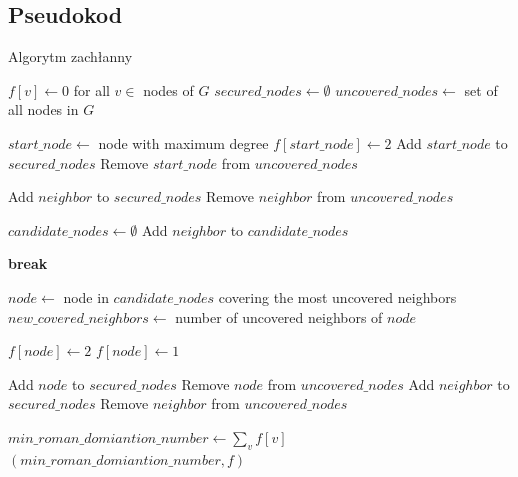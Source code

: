     \subsection{Pseudokod}

    \begin{algorithm}
    \caption*{Algorytm zachłanny}
    \begin{algorithmic}[1]
        \State $f[v] \gets 0$ for all $v \in$ nodes of $G$
        \State $secured\_nodes \gets \emptyset$
        \State $uncovered\_nodes \gets$ set of all nodes in $G$

        \State $start\_node \gets$ node with maximum degree
        \State $f[start\_node] \gets 2$
        \State Add $start\_node$ to $secured\_nodes$
        \State Remove $start\_node$ from $uncovered\_nodes$
        
            \State Add $neighbor$ to $secured\_nodes$
            \State Remove $neighbor$ from $uncovered\_nodes$
        \EndFor

            \State $candidate\_nodes \gets \emptyset$
                        \State Add $neighbor$ to $candidate\_nodes$
                    \EndIf
                \EndFor
            \EndFor

                \State \textbf{break}
            \EndIf

            \State $node \gets$ node in $candidate\_nodes$ covering the most uncovered neighbors
            \State $new\_covered\_neighbors \gets$ number of uncovered neighbors of $node$

                \State $f[node] \gets 2$
            \Else
                \State $f[node] \gets 1$
            \EndIf

            \State Add $node$ to $secured\_nodes$
            \State Remove $node$ from $uncovered\_nodes$
                \State Add $neighbor$ to $secured\_nodes$
                \State Remove $neighbor$ from $uncovered\_nodes$
            \EndFor
        \EndWhile

        \State $min\_roman\_domiantion\_number \gets \sum_{v} f[v]$
        \State \Return $(min\_roman\_domiantion\_number, f)$
        \EndFunction
    \end{algorithmic}
\end{algorithm}

